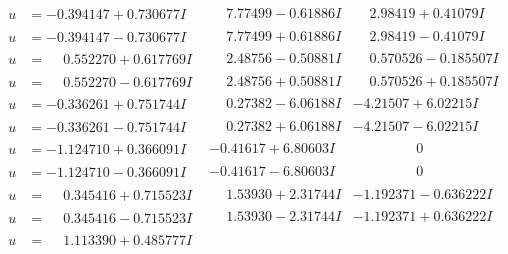 \documentclass[1p]{elsarticle_modified}
\theoremstyle{definition}
\begin{document}
$$\begin{array}{c|c|c}
 \hline 
\begin{aligned}
u &= -0.394147 + 0.730677 I\end{aligned}
 & \phantom{-}7.77499 - 0.61886 I & \phantom{-}2.98419 + 0.41079 I \\ \hline\begin{aligned}
u &= -0.394147 - 0.730677 I\end{aligned}
 & \phantom{-}7.77499 + 0.61886 I & \phantom{-}2.98419 - 0.41079 I \\ \hline\begin{aligned}
u &= \phantom{-}0.552270 + 0.617769 I\end{aligned}
 & \phantom{-}2.48756 - 0.50881 I & \phantom{-}0.570526 - 0.185507 I \\ \hline\begin{aligned}
u &= \phantom{-}0.552270 - 0.617769 I\end{aligned}
 & \phantom{-}2.48756 + 0.50881 I & \phantom{-}0.570526 + 0.185507 I \\ \hline\begin{aligned}
u &= -0.336261 + 0.751744 I\end{aligned}
 & \phantom{-}0.27382 - 6.06188 I & -4.21507 + 6.02215 I \\ \hline\begin{aligned}
u &= -0.336261 - 0.751744 I\end{aligned}
 & \phantom{-}0.27382 + 6.06188 I & -4.21507 - 6.02215 I \\ \hline\begin{aligned}
u &= -1.124710 + 0.366091 I\end{aligned}
 & -0.41617 + 6.80603 I & \phantom{-0.000000 } 0 \\ \hline\begin{aligned}
u &= -1.124710 - 0.366091 I\end{aligned}
 & -0.41617 - 6.80603 I & \phantom{-0.000000 } 0 \\ \hline\begin{aligned}
u &= \phantom{-}0.345416 + 0.715523 I\end{aligned}
 & \phantom{-}1.53930 + 2.31744 I & -1.192371 - 0.636222 I \\ \hline\begin{aligned}
u &= \phantom{-}0.345416 - 0.715523 I\end{aligned}
 & \phantom{-}1.53930 - 2.31744 I & -1.192371 + 0.636222 I \\ \hline\begin{aligned}
u &= \phantom{-}1.113390 + 0.485777 I\end{aligned}

\end{array}$$
\end{document}
